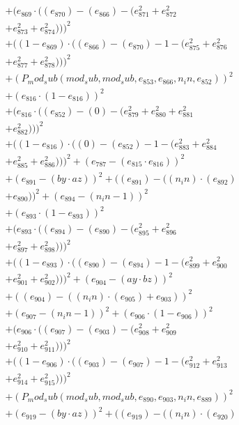\documentclass[10pt, a4paper]{article}
\begin{document}
\begin{align*}
& + (e_{869}  \cdot  ((e_{870}) - (e_{866}) - (e_{871}^{2} + e_{872}^{2} \\
& + e_{873}^{2} + e_{874}^{2})))^{2} \\
& + ((1 - e_{869})  \cdot  ((e_{866}) - (e_{870}) - 1 - (e_{875}^{2} + e_{876}^{2} \\
& + e_{877}^{2} + e_{878}^{2})))^{2} \\
& + (P_mod_sub(mod_sub, mod_sub, e_{853}, e_{866}, n_in, e_{852}))^{2} \\
& + (e_{816}  \cdot  (1 - e_{816}))^{2} \\
& + (e_{816}  \cdot  ((e_{852}) - (0) - (e_{879}^{2} + e_{880}^{2} + e_{881}^{2} \\
& + e_{882}^{2})))^{2} \\
& + ((1 - e_{816})  \cdot  ((0) - (e_{852}) - 1 - (e_{883}^{2} + e_{884}^{2} \\
& + e_{885}^{2} + e_{886}^{2})))^{2} + (e_{787} - (e_{815}  \cdot  e_{816}))^{2} \\
& + (e_{891} - (by  \cdot  az))^{2} + ((e_{891}) - ((n_in)  \cdot  (e_{892}) \\
& + e_{890}))^{2} + (e_{894} - (n_in - 1))^{2} \\
& + (e_{893}  \cdot  (1 - e_{893}))^{2} \\
& + (e_{893}  \cdot  ((e_{894}) - (e_{890}) - (e_{895}^{2} + e_{896}^{2} \\
& + e_{897}^{2} + e_{898}^{2})))^{2} \\
& + ((1 - e_{893})  \cdot  ((e_{890}) - (e_{894}) - 1 - (e_{899}^{2} + e_{900}^{2} \\
& + e_{901}^{2} + e_{902}^{2})))^{2} + (e_{904} - (ay  \cdot  bz))^{2} \\
& + ((e_{904}) - ((n_in)  \cdot  (e_{905}) + e_{903}))^{2} \\
& + (e_{907} - (n_in - 1))^{2} + (e_{906}  \cdot  (1 - e_{906}))^{2} \\
& + (e_{906}  \cdot  ((e_{907}) - (e_{903}) - (e_{908}^{2} + e_{909}^{2} \\
& + e_{910}^{2} + e_{911}^{2})))^{2} \\
& + ((1 - e_{906})  \cdot  ((e_{903}) - (e_{907}) - 1 - (e_{912}^{2} + e_{913}^{2} \\
& + e_{914}^{2} + e_{915}^{2})))^{2} \\
& + (P_mod_sub(mod_sub, mod_sub, e_{890}, e_{903}, n_in, e_{889}))^{2} \\
& + (e_{919} - (by  \cdot  az))^{2} + ((e_{919}) - ((n_in)  \cdot  (e_{920}) \\

\end{align*}
\end{document}
